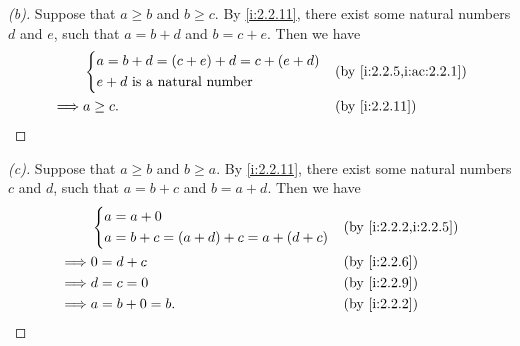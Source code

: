 \begin{proof}[(b)]
  Suppose that \(a \geq b\) and \(b \geq c\).
  By \cref{i:2.2.11}, there exist some natural numbers \(d\) and \(e\), such that \(a = b + d\) and \(b = c + e\).
  Then we have
  \begin{align*}
             & \begin{dcases}
                 a = b + d = (c + e) + d = c + (e + d) \\
                 e + d \text{ is a natural number}
               \end{dcases} &  & \by{i:2.2.5,i:ac:2.2.1}                   \\
    \implies & a \geq c.                                &  & \by{i:2.2.11}
  \end{align*}
\end{proof}

\begin{proof}[(c)]
  Suppose that \(a \geq b\) and \(b \geq a\).
  By \cref{i:2.2.11}, there exist some natural numbers \(c\) and \(d\), such that \(a = b + c\) and \(b = a + d\).
  Then we have
  \begin{align*}
             & \begin{dcases}
                 a = a + 0 \\
                 a = b + c = (a + d) + c = a + (d + c)
               \end{dcases} &  & \by{i:2.2.2,i:2.2.5}                  \\
    \implies & 0 = d + c                             &  & \by{i:2.2.6} \\
    \implies & d = c = 0                             &  & \by{i:2.2.9} \\
    \implies & a = b + 0 = b.                        &  & \by{i:2.2.2}
  \end{align*}
\end{proof}

